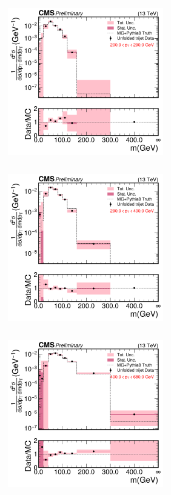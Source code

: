   \begin{figure}[htp!]
    \centering
    \begin{subfigure}
      \centering
      \includegraphics[width=0.45\textwidth]{figures/multijet/unfolding/trijet/binnedResult_ungroomed_0.pdf}
    \end{subfigure}%
    \begin{subfigure}
      \centering
      \includegraphics[width=0.45\textwidth]{figures/multijet/unfolding/trijet/binnedResult_ungroomed_1.pdf}
    \end{subfigure}%
    \begin{subfigure}
      \centering
      \includegraphics[width=0.45\textwidth]{figures/multijet/unfolding/trijet/binnedResult_ungroomed_2.pdf}
    \end{subfigure}%
    \begin{subfigure}
      \centering

\end{subfigure}
\end{figure}
